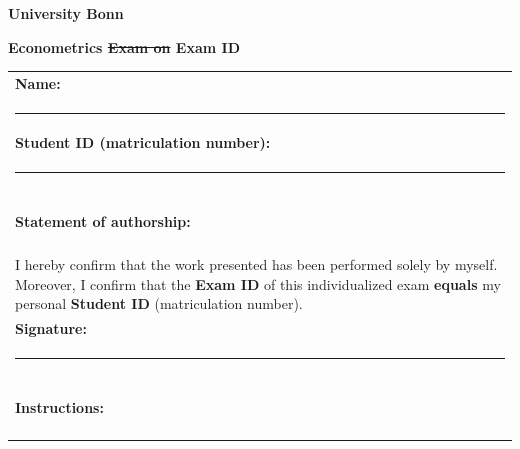 \documentclass[10pt,a4paper]{article}
\makeatletter
\newcommand{\myID}{\@ID}
\newcommand{\myDate}{\@Date}
\makeatother
\begin{document}
\thispagestyle{empty}
{\sf
\textbf{\LARGE{University Bonn}}

\textbf{\large{Econometrics \st{Exam on } \myDate \hfill Exam ID \myID}}

\vspace*{2cm}

\begin{tabular}{p{14cm}}
\textbf{Name:}\\[.1cm]
\hrule \\[1.5cm]
\textbf{Student ID (matriculation number):} \\[.1cm]
\hrule \\[1.5cm]

\paragraph*{Statement of authorship:}\\[2ex]
I hereby confirm that the work presented has been performed solely by myself. 
Moreover, I confirm that the \textbf{Exam ID \myID} of this individualized exam \textbf{equals} my personal \textbf{Student ID}  (matriculation number).\\[5ex]

\textbf{Signature:} \\[.1cm]
\hrule  \\[1.5cm]
\paragraph*{Instructions:}\\[2ex]
\end{tabular}

\vspace*{1cm}

}
\newpage

\begin{enumerate}


\end{enumerate}
\end{document}
